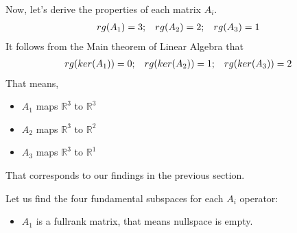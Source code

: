 \documentclass[letterpaper,10pt,english]{jupyterBook}
\begin{document}
\sphinxAtStartPar
Now, let’s derive the properties of each matrix \(A_i\).
\begin{equation*}
\begin{split}
rg(A_1) = 3;\hspace{3mm}rg(A_2) = 2;\hspace{3mm}rg(A_3) = 1
\end{split}
\end{equation*}
\sphinxAtStartPar
It follows from the Main theorem of Linear Algebra that
\begin{equation*}
\begin{split}
rg(ker(A_1)) = 0;\hspace{3mm}rg(ker(A_2)) = 1;\hspace{3mm}rg(ker(A_3)) = 2
\end{split}
\end{equation*}
\sphinxAtStartPar
That means,
\begin{itemize}
\item {} 
\sphinxAtStartPar
\(A_1\) maps \(\mathbb{R}^3\) to \(\mathbb{R}^3\)

\item {} 
\sphinxAtStartPar
\(A_2\) maps \(\mathbb{R}^3\) to \(\mathbb{R}^2\)

\item {} 
\sphinxAtStartPar
\(A_3\) maps \(\mathbb{R}^3\) to \(\mathbb{R}^1\)

\end{itemize}

\sphinxAtStartPar
That corresponds to our findings in the previous section.

\sphinxAtStartPar
Let us find the four fundamental subspaces for each \(A_i\) operator:
\begin{itemize}
\item {} 
\sphinxAtStartPar
\(A_1\) is a full\sphinxhyphen{}rank matrix, that means nullspace is empty.

\end{itemize}
\end{document}

